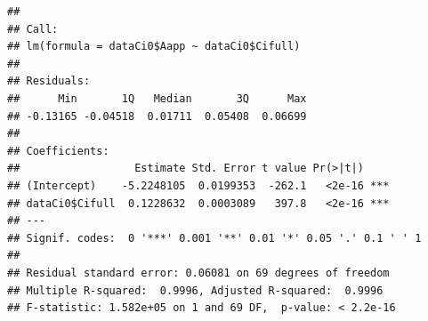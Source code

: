 \documentclass[
]{krantz}
\makeatletter
\newenvironment{Shaded}{\begin{snugshade}}{\end{snugshade}}
\newcommand{\CommentTok}[1]{\textcolor[rgb]{0.56,0.35,0.01}{\textit{#1}}}
\newcommand{\DecValTok}[1]{\textcolor[rgb]{0.00,0.00,0.81}{#1}}
\newcommand{\FunctionTok}[1]{\textcolor[rgb]{0.00,0.00,0.00}{#1}}
\newcommand{\NormalTok}[1]{#1}
\newcommand{\OtherTok}[1]{\textcolor[rgb]{0.56,0.35,0.01}{#1}}
\newcommand{\SpecialCharTok}[1]{\textcolor[rgb]{0.00,0.00,0.00}{#1}}
\newcommand{\StringTok}[1]{\textcolor[rgb]{0.31,0.60,0.02}{#1}}
\newenvironment{kframe}{%
\medskip{}
\setlength{\fboxsep}{.8em}
 \def\at@end@of@kframe{}%
 \ifinner\ifhmode%
  \def\at@end@of@kframe{\end{minipage}}%
  \begin{minipage}{\columnwidth}%
 \fi\fi%
 \def\FrameCommand##1{\hskip\@totalleftmargin \hskip-\fboxsep
 \colorbox{shadecolor}{##1}\hskip-\fboxsep
     \hskip-\linewidth \hskip-\@totalleftmargin \hskip\columnwidth}%
 \MakeFramed {\advance\hsize-\width
   \@totalleftmargin\z@ \linewidth\hsize
   \@setminipage}}%
 {\par\unskip\endMakeFramed%
 \at@end@of@kframe}
\renewenvironment{Shaded}{\begin{kframe}}{\end{kframe}}
\makeatother
\begin{document}
\begin{Shaded}
\end{Shaded}

\begin{verbatim}
## 
## Call:
## lm(formula = dataCi0$Aapp ~ dataCi0$Cifull)
## 
## Residuals:
##      Min       1Q   Median       3Q      Max 
## -0.13165 -0.04518  0.01711  0.05408  0.06699 
## 
## Coefficients:
##                  Estimate Std. Error t value Pr(>|t|)    
## (Intercept)    -5.2248105  0.0199353  -262.1   <2e-16 ***
## dataCi0$Cifull  0.1228632  0.0003089   397.8   <2e-16 ***
## ---
## Signif. codes:  0 '***' 0.001 '**' 0.01 '*' 0.05 '.' 0.1 ' ' 1
## 
## Residual standard error: 0.06081 on 69 degrees of freedom
## Multiple R-squared:  0.9996, Adjusted R-squared:  0.9996 
## F-statistic: 1.582e+05 on 1 and 69 DF,  p-value: < 2.2e-16
\end{verbatim}

\begin{Shaded}
\end{Shaded}
\end{document}
